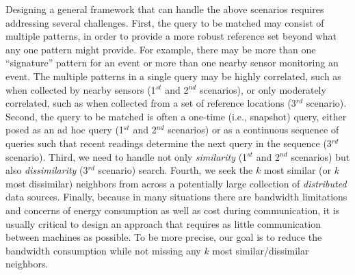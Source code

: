 
Designing a general framework that can handle the above scenarios
requires addressing several challenges. First, the query to be matched
may consist of multiple patterns, in order to provide a more robust
reference set beyond what any one pattern might provide.  For
example, there may be more than one ``signature'' pattern for an event
or more than one nearby sensor monitoring an event.  The multiple patterns
in a single query may be highly correlated, such as when collected by
nearby sensors (1$^{st}$ and 2$^{nd}$ scenarios), or only moderately
correlated, such as when collected from a set of reference locations
(3$^{rd}$ scenario).  Second, the query to be matched is often a
one-time (i.e., snapshot) query, either posed as an ad hoc query
(1$^{st}$ and 2$^{nd}$ scenarios) or as a continuous sequence of
queries such that recent readings determine the next query in the
sequence (3$^{rd}$ scenario).  Third, we need to handle not only
\emph{similarity} (1$^{st}$ and 2$^{nd}$ scenarios) but also \emph{dissimilarity}
(3$^{rd}$ scenario) search.  Fourth, we seek the $k$ most similar (or
$k$ most dissimilar) neighbors from across a potentially large
collection of \emph{distributed} data sources.  Finally, because in
many situations there are bandwidth limitations and concerns of energy
consumption as well as cost during communication, it is usually
critical to design an approach that requires as little communication
between machines as possible. To be more precise, our goal is to reduce
the bandwidth consumption while not missing any $k$ most similar/dissimilar neighbors.

